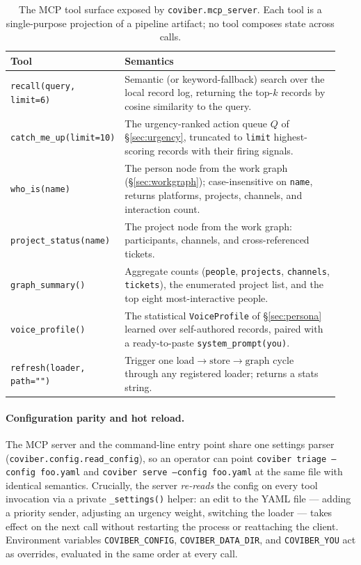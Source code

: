\begin{table}[t]
\small
\centering
\begin{tabular}{@{}p{0.28\linewidth}p{0.66\linewidth}@{}}
\toprule
\textbf{Tool} & \textbf{Semantics} \\
\midrule
\texttt{recall(query, limit=6)} & Semantic (or keyword-fallback) search over the local record log, returning the top-$k$ records by cosine similarity to the query. \\
\texttt{catch\_me\_up(limit=10)} & The urgency-ranked action queue $Q$ of \S\ref{sec:urgency}, truncated to \texttt{limit} highest-scoring records with their firing signals. \\
\texttt{who\_is(name)} & The person node from the work graph (\S\ref{sec:workgraph}); case-insensitive on \texttt{name}, returns platforms, projects, channels, and interaction count. \\
\texttt{project\_status(name)} & The project node from the work graph: participants, channels, and cross-referenced tickets. \\
\texttt{graph\_summary()} & Aggregate counts (\texttt{people}, \texttt{projects}, \texttt{channels}, \texttt{tickets}), the enumerated project list, and the top eight most-interactive people. \\
\texttt{voice\_profile()} & The statistical \texttt{VoiceProfile} of \S\ref{sec:persona} learned over self-authored records, paired with a ready-to-paste \texttt{system\_prompt(you)}. \\
\texttt{refresh(loader, path="")} & Trigger one \(\text{load} \to \text{store} \to \text{graph}\) cycle through any registered loader; returns a stats string. \\
\bottomrule
\end{tabular}
\caption{The MCP tool surface exposed by \texttt{coviber.mcp\_server}. Each tool is a single-purpose projection of a pipeline artifact; no tool composes state across calls.}
\label{tab:mcp-tools}
\end{table}

\paragraph{Configuration parity and hot reload.}
The MCP server and the command-line entry point share one settings parser (\texttt{coviber.config.read\_config}), so an operator can point \texttt{coviber triage --config foo.yaml} and \texttt{coviber serve --config foo.yaml} at the same file with identical semantics. Crucially, the server \emph{re-reads} the config on every tool invocation via a private \texttt{\_settings()} helper: an edit to the YAML file --- adding a priority sender, adjusting an urgency weight, switching the loader --- takes effect on the next call without restarting the process or reattaching the client. Environment variables \texttt{COVIBER\_CONFIG}, \texttt{COVIBER\_DATA\_DIR}, and \texttt{COVIBER\_YOU} act as overrides, evaluated in the same order at every call.

